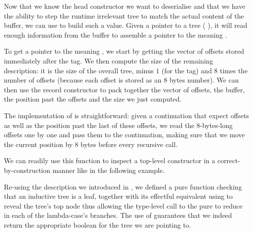 Now that we know the head constructor we want to deserialise and that
we have the ability to step the runtime irrelevant tree to match the
actual content of the buffer, we can use 
to build such a value.
%
Given a pointer to a tree ( \IdrisData{\#} ),
it will read enough information from the buffer to assemble a pointer to
the meaning .


To get a pointer to the meaning ,
we start by getting the vector of offsets stored
immediately after the tag. We then compute the size of the remaining
 description: it is the size of the overall tree,
minus $1$ (for the tag) and $8$ times the number of offsets (because
each offset is stored as an 8 bytes number).
%
We can then use the record constructor  to pack
together the vector of offsets, the buffer, the position past the offsets
and the size we just computed.


The implementation of  is straightforward: given
a continuation that expect  offsets as well as the
position past the last of these offsets, we read the 8-bytes-long
offsets one by one and pass them to the continuation, making sure
that we move the current position by 8 bytes before every recursive call.

We can readily use this function to inspect a top-level
constructor in a correct-by-construction manner like in
the following example.

\noindent
\begin{minipage}[t]{.4\textwidth}
\end{minipage}\hfill\begin{minipage}[t]{.5\textwidth}
\end{minipage}\medskip

Re-using the  description we
introduced in , we defined a
pure  function checking that
an inductive tree is a leaf, together with its
effectful equivalent using 
to reveal the tree's top node thus allowing the
type-level call to the pure 
to reduce in each of the lambda-case's branches.
%
The use of  guarantees that
we indeed return the appropriate boolean for the
tree we are pointing to.

